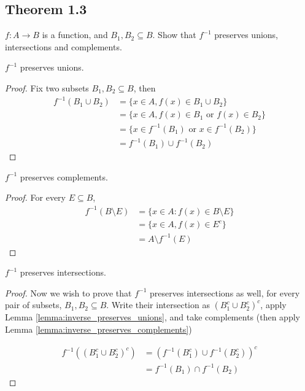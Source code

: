 \documentclass[../../main.tex]{subfiles}
\begin{document}
\subsection{Theorem 1.3}
\begin{wts} %
   $f: A \to B$ is a function, and $B_1, B_2\subseteq B$. Show that $f^{-1}$ preserves unions, intersections and complements.
\end{wts}
\begin{lemma}\label{lemma:inverse_preserves_unions}
    $f^{-1}$ preserves unions.
\end{lemma}
\begin{proof}
    Fix two subsets $B_1, B_2\subseteq B$, then 
    \begin{align*}
        f^{-1}(B_1\cup B_2) &= \{x\in A, f(x) \in B_1\cup B_2\}\\[2ex]
        &= \{x\in A, f(x) \in B_1 \text{ or } f(x) \in B_2\}\\[2ex]
        &= \{x\in f^{-1}(B_1) \text{ or } x\in f^{-1}(B_2)\}\\[2ex]
        &= f^{-1}(B_1)\cup f^{-1}(B_2)
    \end{align*}
\end{proof} %

\begin{lemma}\label{lemma:inverse_preserves_complements}
    $f^{-1}$ preserves complements.
\end{lemma}
\begin{proof}
    For every $E\subseteq B$, 
    \begin{align*}
        f^{-1}(B\setminus E) &= \{x\in A:f(x)\in B\setminus E\}\\
        &=\{x\in A, f(x)\in E^c\}\\
        &= A\setminus f^{-1}(E)
    \end{align*}
\end{proof}

\begin{lemma}\label{lemma:inverse_preserves_intersections}
    $f^{-1}$ preserves intersections.
\end{lemma}
\begin{proof}
    Now we wish to prove that $f^{-1}$ preserves intersections as well, for every pair of subsets, $B_1, B_2\subseteq B$. Write their intersection as $(B_1^c\cup B_2^c)^c$, apply Lemma \eqref{lemma:inverse_preserves_unions}, and take complements (then apply Lemma \eqref{lemma:inverse_preserves_complements})

    \begin{align*}
        f^{-1}\left((B_1^c\cup B_2^c)^c\right) &= (f^{-1}(B_1^c)\cup f^{-1}(B_2^c))^c\\
        &=f^{-1}(B_1)\cap f^{-1}(B_2)
    \end{align*}
\end{proof}
\end{document}
